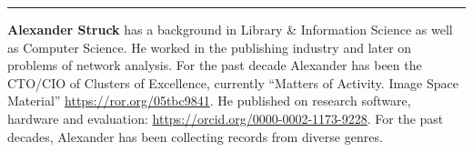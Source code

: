 \begin{center}\rule{0.5\linewidth}{0.5pt}\end{center}

\textbf{Alexander Struck} has a background in Library \& Information
Science as well as Computer Science. He worked in the publishing
industry and later on problems of network analysis. For the past decade
Alexander has been the CTO/CIO of Clusters of Excellence, currently
``Matters of Activity. Image Space Material''
\url{https://ror.org/05tbc9841}. He published on research software,
hardware and evaluation: \url{https://orcid.org/0000-0002-1173-9228}.
For the past decades, Alexander has been collecting records from diverse
genres.

